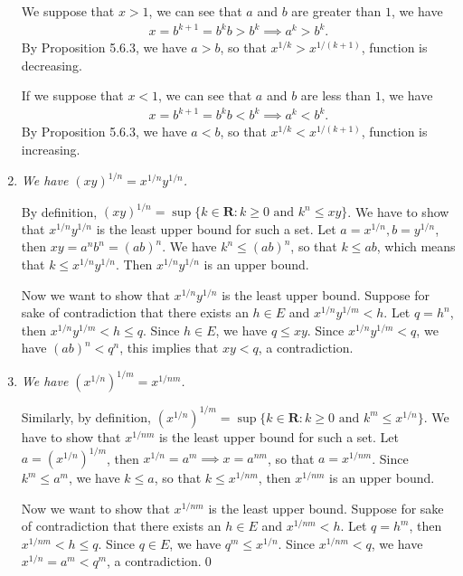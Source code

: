 \documentclass{book}
\begin{document}
\begin{enumerate}
    We suppose that $x>1$, we can see that $a$ and $b$ are greater than $1$, we have
        \begin{align*}
            x=b^{k+1}=b^kb>b^k\implies a^k>b^k.
        \end{align*}
    By Proposition 5.6.3, we have $a>b$, so that $x^{1/k}>x^{1/(k+1)}$, function is decreasing.
    
    If we suppose that $x<1$, we can see that $a$ and $b$ are less than $1$, we have
        \begin{align*}
            x=b^{k+1}=b^kb<b^k\implies a^k<b^k.
        \end{align*}
    By Proposition 5.6.3, we have $a<b$, so that $x^{1/k}<x^{1/(k+1)}$, function is increasing.

    \item \emph{We have $(xy)^{1/n}=x^{1/n}y^{1/n}$.}

    By definition, $(xy)^{1/n}=\sup\{k\in\mathbf{R}:k\geq 0\text{ and }k^n\leq xy\}$. We have to show that $x^{1/n}y^{1/n}$ is the least upper bound for such a set. Let $a=x^{1/n},b=y^{1/n}$, then $xy=a^nb^n=(ab)^{n}$. We have $k^n\leq (ab)^{n}$, so that $k\leq ab$, which means that $k\leq x^{1/n}y^{1/n}$. Then $x^{1/n}y^{1/n}$ is an upper bound.

    Now we want to show that $x^{1/n}y^{1/n}$ is the least upper bound. Suppose for sake of contradiction that there exists an $h\in E$ and $x^{1/n}y^{1/m}<h$. Let $q=h^n$, then $x^{1/n}y^{1/m}<h\leq q$. Since $h\in E$, we have $q\leq xy$. Since $x^{1/n}y^{1/m}<q$, we have $(ab)^n<q^n$, this implies that $xy<q$, a contradiction.

    \item \emph{We have $(x^{1/n})^{1/m}=x^{1/nm}$.}

    Similarly, by definition, $(x^{1/n})^{1/m}=\sup\{k\in\mathbf{R}:k\geq 0\text{ and }k^m\leq x^{1/n}\}$. We have to show that $x^{1/nm}$ is the least upper bound for such a set. Let $a=(x^{1/n})^{1/m}$, then $x^{1/n}={a^m}\implies x=a^{nm}$, so that $a=x^{1/nm}$. Since $k^m\leq a^m$, we have $k\leq a$, so that $k\leq x^{1/nm}$, then $x^{1/nm}$ is an upper bound.

    Now we want to show that $x^{1/nm}$ is the least upper bound. Suppose for sake of contradiction that there exists an $h\in E$ and $x^{1/nm}<h$. Let $q=h^m$, then $x^{1/nm}<h\leq q$. Since $q\in E$, we have $q^m\leq x^{1/n}$. Since $x^{1/nm}<q$, we have $x^{1/n}=a^m<q^m$, a contradiction.\qed

\end{enumerate}
\end{document}
